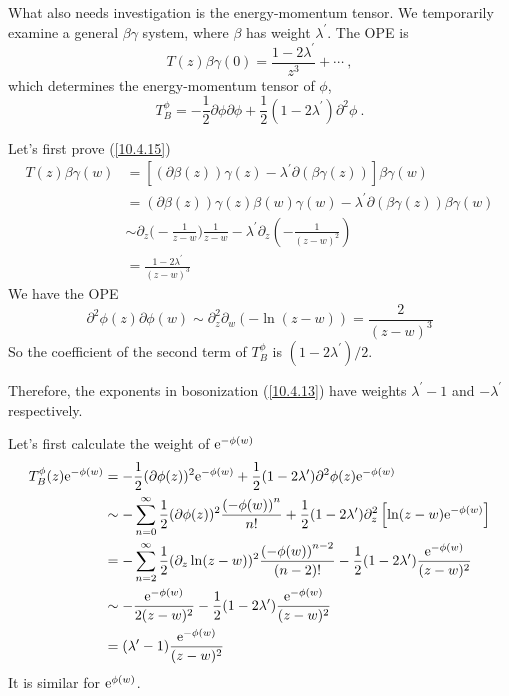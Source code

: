 	What also needs investigation is the energy-momentum tensor. We temporarily examine a general $\beta\gamma$ system, where $\beta$ has weight $\lambda^{\prime}$. The OPE is
	\begin{equation}
		T(z)\beta\gamma(0) = \frac{1-2\lambda^{\prime}}{z^{3}}+\cdots \:, \label{10.4.15}
	\end{equation}
	which determines the energy-momentum tensor of $\phi$,
	\begin{equation}
		T_{B}^{\phi}=-\frac{1}{2}\partial\phi \partial\phi +\frac{1}{2}(1-2\lambda^{\prime})\partial^{2}\phi\:. \label{10.4.16}
	\end{equation}
	\begin{tcolorbox}[breakable]
		Let's first prove (\ref{10.4.15})
		\begin{align*}
			T(z)\beta \gamma (w) &=[(\partial \beta (z))\gamma (z)-\lambda ^{\prime
			}\partial (\beta \gamma (z))]\beta \gamma (w) \\
			&=(\partial \beta (z))\gamma (z)\beta (w)\gamma (w)-\lambda ^{\prime
			}\partial (\beta \gamma (z))\beta \gamma (w) \\
			&\sim \partial _{z}\biggl(-\frac{1}{z-w}\biggr)\frac{1}{z-w}-\lambda ^{\prime }\partial
			_{z}\left( -\frac{1}{(z-w)^{2}}\right)  \\
			&=\frac{1-2\lambda ^{\prime }}{(z-w)^{3}}
		\end{align*}%
		We have the OPE %
		\[
		\partial ^{2}\phi (z)\partial \phi (w)\sim \partial _{z}^{2}\partial
		_{w}(-\ln (z-w))=\frac{2}{(z-w)^{3}}
		\]%
		So the coefficient of the second term of $T_{B}^{\phi}$ is $(1-2\lambda ^{\prime })/2$.
	\end{tcolorbox}
	\noindent Therefore, the exponents in bosonization (\ref{10.4.13}) have weights $\lambda^{\prime}-1$ and $-\lambda^{\prime}$ respectively.
	\begin{tcolorbox}[breakable]
		Let's first calculate the weight of $\mathrm{e}^{-\phi(w)}$
		\begin{align*}
			T_{B}^{\phi }(z)\me^{-\phi (w)} &=-\frac{1}{2}(\partial \phi (z))^{2}\me^{-\phi
				(w)}+\frac{1}{2}(1-2\lambda ^{\prime })\partial ^{2}\phi (z)\me^{-\phi (w)} \\
			&\sim -\sum_{n=0}^{\infty }\frac{1}{2}(\partial \phi (z))^{2}\frac{\left(
				-\phi (w)\right) ^{n}}{n!}+\frac{1}{2}(1-2\lambda ^{\prime })\partial
			_{z}^{2}\left[ \ln (z-w)\me^{-\phi (w)}\right]  \\
			&=-\sum_{n=2}^{\infty }\frac{1}{2}(\partial _{z}\ln (z-w))^{2}\frac{\left(
				-\phi (w)\right) ^{n-2}}{(n-2)!}-\frac{1}{2}(1-2\lambda ^{\prime })\frac{%
				\me^{-\phi (w)}}{(z-w)^{2}} \\
			&\sim -\frac{\me^{-\phi (w)}}{2(z-w)^{2}}-\frac{1}{2}(1-2\lambda ^{\prime })%
			\frac{\me^{-\phi (w)}}{(z-w)^{2}} \\
			&=(\lambda ^{\prime }-1)\frac{\me^{-\phi (w)}}{(z-w)^{2}}
		\end{align*}
		It is similar for $\mathrm{e}^{\phi(w)}$.
	\end{tcolorbox}
